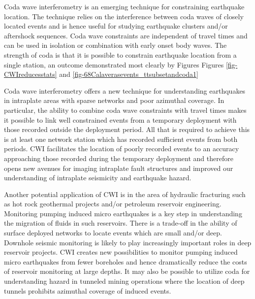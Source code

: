 \documentclass[extra]{gji}
\begin{document}
Coda wave interferometry is an emerging technique for constraining
earthquake location. The technique relies on the interference
between coda waves of closely located events and is hence useful for
studying earthquake clusters and/or aftershock sequences. Coda wave
constraints are independent of travel times and can be used in
isolation or combination with early onset body waves. The strength
of coda is that it is possible to constrain earthquake location from
a single station, an outcome demonstrated most clearly by Figures
Figures \ref{fig-CWIreducesstats} and
\ref{fig-68Calaverasevents_ttsubsetandcoda1}

Coda wave interferometry offers a new technique for understanding
earthquakes in intraplate areas with sparse networks and poor
azimuthal coverage. In particular, the ability to combine coda wave
constraints with travel times makes it possible to link well
constrained events from a temporary deployment with those recorded
outside the deployment period. All that is required to achieve this
is at least one network station which has recorded sufficient events
from both periods. CWI facilitates the location of poorly recorded
events to an accuracy approaching those recorded during the
temporary deployment and therefore opens new avenues for imaging
intraplate fault structures and improved our understanding of
intraplate seismicity and earthquake hazard.

Another potential application of CWI is in the area of hydraulic
fracturing such as hot rock geothermal projects and/or petroleum
reservoir engineering. Monitoring pumping induced micro earthquakes
is a key step in understanding the migration of fluids in such
reservoirs. There is a trade-off in the ability of surface deployed
networks to locate events which are small and/or deep. Downhole
seismic monitoring is likely to play increasingly important roles in
deep reservoir projects. CWI creates new possibilities to monitor
pumping induced micro earthquakes from fewer boreholes and hence
dramatically reduce the costs of reservoir monitoring at large
depths. It may also be possible to utilize coda for understanding
hazard in tunneled mining operations where the location of deep
tunnels prohibits azimuthal coverage of induced events.
\end{document}
